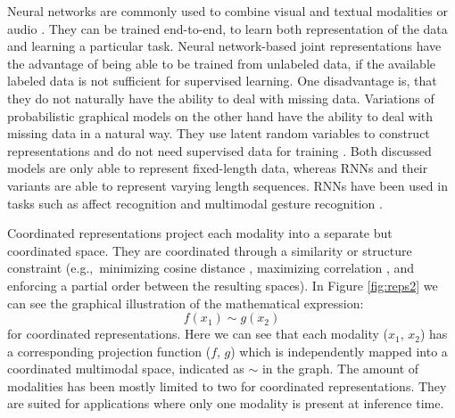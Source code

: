 \documentclass{article}
\begin{document}
Neural networks are commonly used to combine visual and textual modalities \citep{silberer2014learning} or audio \citep{mroueh2015deep, ngiam2011multimodal, wu2014exploring}. They can be trained end-to-end, to learn both representation of the data and learning a particular task. Neural network-based joint representations have the advantage of being able to be trained from unlabeled data, if the available labeled data is not sufficient for supervised learning. One disadvantage is, that they do not naturally have the ability to deal with missing data. Variations of probabilistic graphical models on the other hand have the ability to deal with missing data in a natural way. They use latent random variables to construct representations \citep{bengio2013represent} and do not need supervised data for training \citep{salakhutdinov2009boltz}. Both discussed models are only able to represent fixed-length data, whereas RNNs and their variants are able to represent varying length sequences. RNNs have been used in tasks such as affect recognition \citep{chen2015multi, nicolaou2011contin} and multimodal gesture recognition \citep{rajagopalan2016extend}.

Coordinated representations project each modality into a separate but coordinated space. They are coordinated through a similarity or structure constraint (e.g.,\ minimizing cosine distance \citep{frome2013devise}, maximizing correlation \citep{andrew2013deep}, and enforcing a partial order \citep{vendrov2016order} between the resulting spaces). In Figure \ref{fig:reps2} we can see the graphical illustration of the mathematical expression:
\begin{equation}
f(x_1) \sim g(x_2)
\end{equation}
for coordinated representations. Here we can see that each modality ($x_1$, $x_2$) has a corresponding projection function ($f$, $g$) which is independently mapped into a coordinated multimodal space, indicated as $\sim$ in the graph. The amount of modalities has been mostly limited to two for coordinated representations. They are suited for applications where only one modality is present at inference time.

\end{document}
